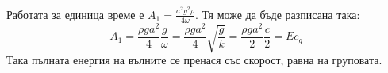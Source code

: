 Работата за единица време е $A_1 = \frac{a^2 g^2 \rho}{4 \omega}$. Тя може да бъде разписана така:
\begin{equation}
  A_1 = \frac{\rho g a^2}{4}\frac{g}{\omega} = \frac{\rho g a^2}{4}\sqrt{\frac{g}{k}}=\frac{\rho g a^2}{2}\frac{c}{2} = E c_g
\end{equation}
Така пълната енергия на вълните се пренася със скорост, равна на груповата.
